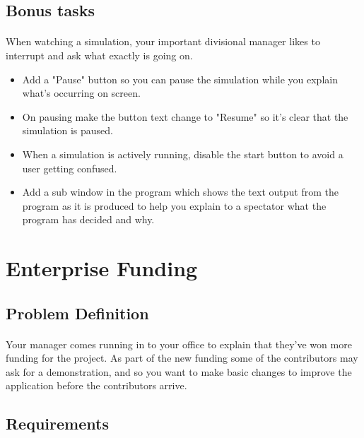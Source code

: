 \documentclass[11pt]{book}
\begin{document}
\subsection{Bonus tasks}

\paragraph{} When watching a simulation, your important divisional manager
likes to interrupt and ask what exactly is going on.

\begin{itemize}
\item Add a "Pause" button so you can pause the simulation while you explain what's occurring on screen.
\item On pausing make the button text change to "Resume" so it's clear that the simulation is paused.
\item When a simulation is actively running, disable the start button to avoid a user getting confused.
\item Add a sub window in the program which shows the text output from the program as it is produced to help you explain to a spectator what the program has decided and why.
\end{itemize}

\clearpage

\section{Enterprise Funding}

\subsection{Problem Definition}

\paragraph{} Your manager comes running in to your office to explain that
they've won more funding for the project. As part of the new funding some of
the contributors may ask for a demonstration, and so you want to make basic
changes to improve the application before the contributors arrive.

\subsection{Requirements}
\end{document}
